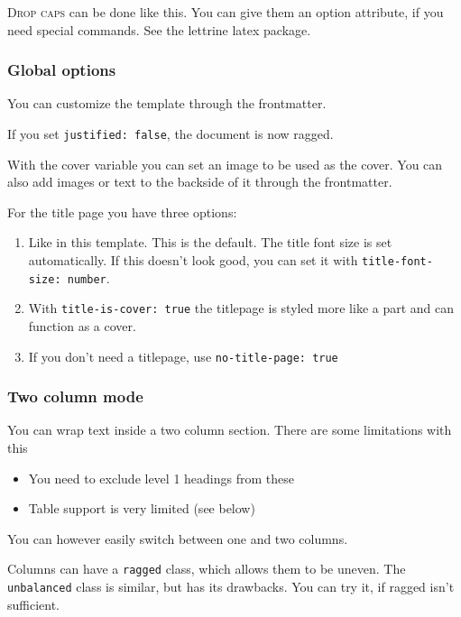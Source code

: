 \documentclass[
  10pt,
  titlepage=firstiscover,
  toc=flat,
  twoside]{scrreprt}
\providecommand{\tightlist}{%
  \setlength{\itemsep}{0pt}\setlength{\parskip}{0pt}}\usepackage{longtable,booktabs,array}
\begin{document}
{\begin{multicols}{2}

\lettrine[lines=3]{D}{rop caps} can be done like this. You can give them
an option attribute, if you need special commands. See the lettrine
latex package.

\subsubsection{Global options}\label{global-options}

You can customize the template through the frontmatter.

If you set \texttt{justified:\ false}, the document is now ragged.

With the cover variable you can set an image to be used as the cover.
You can also add images or text to the backside of it through the
frontmatter.

For the title page you have three options:

\begin{enumerate}
\def\labelenumi{\arabic{enumi}.}
\tightlist
\item
  Like in this template. This is the default. The title font size is set
  automatically. If this doesn't look good, you can set it with
  \texttt{title-font-size:\ number}.
\item
  With \texttt{title-is-cover:\ true} the titlepage is styled more like
  a part and can function as a cover.
\item
  If you don't need a titlepage, use \texttt{no-title-page:\ true}
\end{enumerate}

\subsubsection{Two column mode}\label{two-column-mode}

You can wrap text inside a two column section. There are some
limitations with this

\begin{itemize}
\tightlist
\item
  You need to exclude level 1 headings from these
\item
  Table support is very limited (see below)
\end{itemize}

You can however easily switch between one and two columns.

Columns can have a \texttt{ragged} class, which allows them to be
uneven. The \texttt{unbalanced} class is similar, but has its drawbacks.
You can try it, if ragged isn't sufficient.


\end{multicols}}
\end{document}

